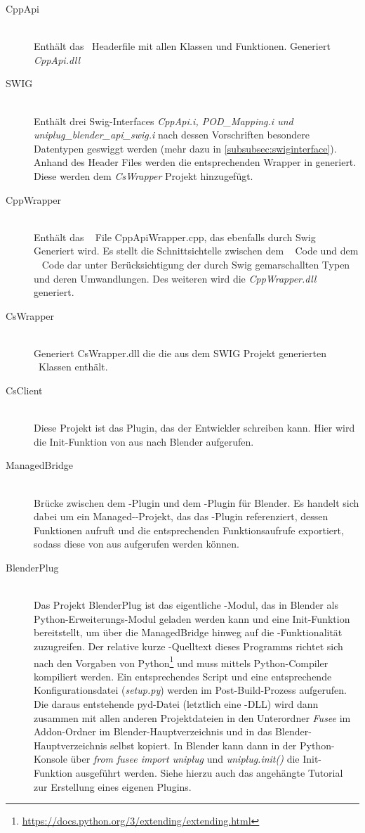 \begin{description}
\item[CppApi]\hfill \\
Enthält das \CC~Headerfile mit allen Klassen und Funktionen. Generiert \emph{CppApi.dll}
\item[SWIG]\hfill \\
Enthält drei Swig-Interfaces \emph{CppApi.i, POD\_Mapping.i und uniplug\_blender\_api\_swig.i} nach dessen Vorschriften besondere Datentypen geswiggt werden (mehr dazu in \ref{subsubsec:swiginterface}). Anhand des Header Files werden die entsprechenden Wrapper in \CS generiert. Diese werden dem \emph{CsWrapper} Projekt hinzugefügt.
\item[CppWrapper]\hfill \\
Enthält das \CC~ File CppApiWrapper.cpp, das ebenfalls durch Swig Generiert wird. Es stellt die Schnittsichtelle zwischen dem \CC~ Code und dem \CS~ Code dar unter Berücksichtigung der durch Swig gemarschallten Typen und deren Umwandlungen. Des weiteren wird die \emph{CppWrapper.dll} generiert.
\item[CsWrapper]\hfill \\
Generiert CsWrapper.dll die die aus dem SWIG Projekt generierten \CS~Klassen enthält. 
\item[CsClient]\hfill \\
Diese Projekt ist das Plugin, das der Entwickler schreiben kann. Hier wird die Init-Funktion von \CS aus nach Blender aufgerufen.
\item[ManagedBridge]\hfill \\ Brücke zwischen dem \CS-Plugin und dem \CC-Plugin für Blender. Es handelt sich dabei um ein Managed-\CC-Projekt, das das \CS-Plugin referenziert, dessen Funktionen aufruft und die entsprechenden Funktionsaufrufe exportiert, sodass diese von \CC aus aufgerufen werden können.
\item[BlenderPlug]\hfill \\ Das Projekt BlenderPlug ist das eigentliche \CC-Modul, das in Blender als Python-Erweiterungs-Modul geladen werden kann und eine Init-Funktion bereitstellt, um über die ManagedBridge hinweg auf die \CS{}-Funktionalität zuzugreifen. Der relative kurze \CC-Quelltext dieses Programms richtet sich nach den Vorgaben von Python\footnote{\url{https://docs.python.org/3/extending/extending.html}} und muss mittels Python-Compiler kompiliert werden. Ein entsprechendes Script und eine entsprechende Konfigurationsdatei (\emph{setup.py}) werden im Post-Build-Prozess aufgerufen. Die daraus entstehende pyd-Datei (letztlich eine \CC-DLL) wird dann zusammen mit allen anderen Projektdateien in den Unterordner \emph{Fusee} im Addon-Ordner im Blender-Hauptverzeichnis und in das Blender-Hauptverzeichnis selbst kopiert. In Blender kann dann in der Python-Konsole über \emph{from fusee import uniplug} und \emph{uniplug.init()} die Init-Funktion ausgeführt werden. Siehe hierzu auch das angehängte Tutorial zur Erstellung eines eigenen Plugins.
\end{description}


